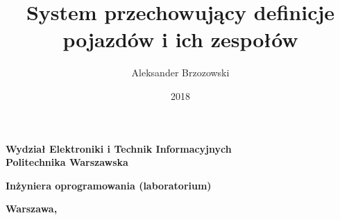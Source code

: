 \documentclass[a4paper,titlepage,11pt,twoside,floatssmall]{report}
\begin{document}
\frenchspacing

\title{\bf System przechowujący definicje pojazdów i ich zespołów\vskip 0.1cm}
\author{Aleksander Brzozowski}
\date{2018}

\makeatletter
\renewcommand{\maketitle}{\begin{titlepage}
\begin{center}{\LARGE {\bf
Wydział Elektroniki i Technik Informacyjnych}}\\
\vspace{0.4cm}
{\LARGE {\bf Politechnika Warszawska}}\\
\vspace{0.3cm}
\end{center}
\vspace{5cm}
\begin{center}
{\bf \LARGE Inżyniera oprogramowania (laboratorium) \vskip 0.1cm}
\end{center}
\vspace{1cm}
\begin{center}
{\bf \LARGE \@title}
\end{center}
\vspace{2cm}
\begin{center}
{\bf \Large \@author \par}
\end{center}
\vspace*{\stretch{6}}
\begin{center}
\bf{\large{Warszawa, \@date\vskip 0.1cm}}
\end{center}
\end{titlepage}
}
\makeatother

\maketitle

\tableofcontents



\end{document}
